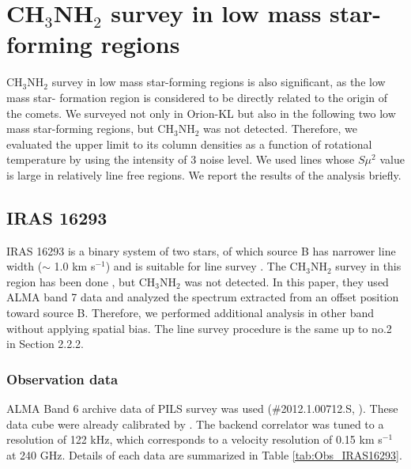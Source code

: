 \chapter{CH$_{3}$NH$_{2}$ survey in low mass star-forming regions
\label{chap:appendixA}}

CH$_{3}$NH$_{2}$ survey in low mass star-forming regions is also significant, 
as the low mass star- formation region is considered to be directly related to the origin of the comets. 
We surveyed not only in Orion-KL but also in the following two low mass star-forming regions, 
but CH$_{3}$NH$_{2}$ was not detected.  
Therefore, we evaluated the upper limit to its column densities as a function of rotational temperature 
by using the intensity of 3 noise level. 
We used lines whose $S\mu^2$ value is large  in relatively line free regions.
We report the results of the analysis briefly.

\section{IRAS 16293}
IRAS 16293 is a binary system of two stars, of which source B has narrower line width 
($\sim$ 1.0 km s$^{-1}$) and is suitable for line survey \citep{Persson+2018}. 
The CH$_{3}$NH$_{2}$ survey in this region has been done \citep{Ligterink+2018}, 
but CH$_{3}$NH$_{2}$ was not detected.
In this paper, they used ALMA  band 7 data and analyzed the spectrum extracted from an offset position toward source B.
Therefore, we performed additional analysis in other band without applying spatial bias. 
The line survey procedure is the same up to no.2 in Section 2.2.2.

\subsection{Observation data}
ALMA Band 6 archive data of PILS survey was used (\#2012.1.00712.S, \citet{Jorgensen+2016}).
These data cube were already calibrated by \citet{Oya+2016}.  
The backend correlator was tuned to a resolution of 122 kHz, which corresponds to a
velocity resolution of 0.15 km s$^{-1}$ at 240 GHz.
Details of each data are summarized in Table \ref{tab:Obs_IRAS16293}.

